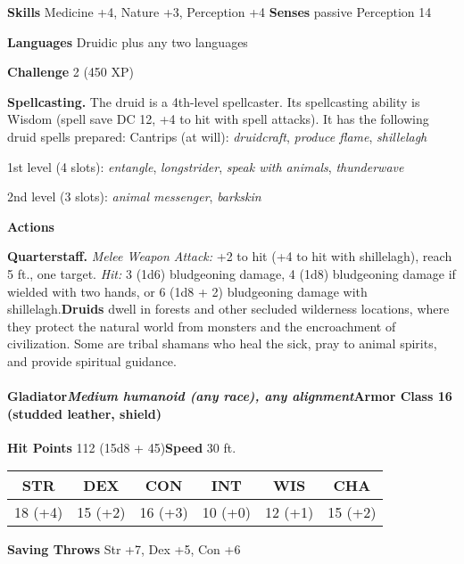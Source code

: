 \documentclass[
]{article}
\begin{document}
\textbf{Skills} Medicine +4, Nature +3, Perception +4 \textbf{Senses}
passive Perception 14

\textbf{Languages} Druidic plus any two languages

\textbf{Challenge} 2 (450 XP)

\textbf{Spellcasting.} The druid is a 4th-level spellcaster. Its
spellcasting ability is Wisdom (spell save DC 12, +4 to hit with spell
attacks). It has the following druid spells prepared: Cantrips (at
will): \emph{druidcraft}, \emph{produce flame}, \emph{shillelagh}

1st level (4 slots): \emph{entangle}, \emph{longstrider}, \emph{speak
with animals}, \emph{thunderwave}

2nd level (3 slots): \emph{animal messenger}, \emph{barkskin}

\textbf{Actions}

\textbf{Quarterstaff.} \emph{Melee Weapon Attack:} +2 to hit (+4 to hit
with shillelagh), reach 5 ft., one target. \emph{Hit:} 3 (1d6)
bludgeoning damage, 4 (1d8) bludgeoning damage if wielded with two
hands, or 6 (1d8 + 2) bludgeoning damage with shillelagh.\textbf{Druids}
dwell in forests and other secluded wilderness locations, where they
protect the natural world from monsters and the encroachment of
civilization. Some are tribal shamans who heal the sick, pray to animal
spirits, and provide spiritual guidance.

\hypertarget{gladiatormedium-humanoid-any-race-any-alignmentarmor-class-16-studded-leather-shield}{%
\paragraph{\texorpdfstring{Gladiator\emph{Medium humanoid (any race),
any alignment}\textbf{Armor Class} 16 (studded leather,
shield)}{GladiatorMedium humanoid (any race), any alignmentArmor Class 16 (studded leather, shield)}}\label{gladiatormedium-humanoid-any-race-any-alignmentarmor-class-16-studded-leather-shield}}

\textbf{Hit Points} 112 (15d8 + 45)\textbf{Speed} 30 ft.

\begin{longtable}[]{@{}cccccc@{}}
\toprule
STR & DEX & CON & INT & WIS & CHA\tabularnewline
\midrule
\endhead
18 (+4) & 15 (+2) & 16 (+3) & 10 (+0) & 12 (+1) & 15 (+2)\tabularnewline
\bottomrule
\end{longtable}

\textbf{Saving Throws} Str +7, Dex +5, Con +6
\end{document}
